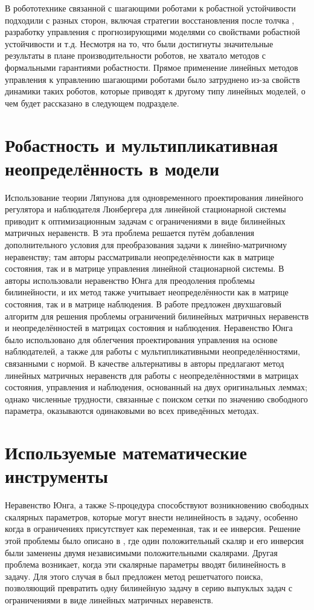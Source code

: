 В робототехнике связанной с шагающими роботами к робастной устойчивости подходили с разных сторон, включая стратегии восстановления после толчка \cite{Pratt2006}, разработку управления с прогнозирующими моделями со свойствами робастной устойчивости \cite{KIM2019} и т.д. Несмотря на то, что были достигнуты значительные результаты в плане производительности роботов, не хватало методов с формальными гарантиями робастности. Прямое применение линейных методов управления к управлению шагающими роботами было затруднено из-за свойств динамики таких роботов, которые приводят к другому типу линейных моделей, о чем будет рассказано в следующем подразделе.

\section{Робастность и мультипликативная неопределённость в модели}\label{sec:ch1/sec5}
Использование теории Ляпунова для одновременного проектирования линейного регулятора и наблюдателя Люнбергера для линейной стационарной системы приводит к оптимизационным задачам с ограничениями в виде билинейных матричных неравенств. В \cite{LIEN2004} эта проблема решается путём добавления дополнительного условия для преобразования задачи к линейно-матричному неравенству; там авторы рассматривали неопределённости как в матрице состояния, так и в матрице управления линейной стационарной системы. В \cite{KHELOUFI2013} авторы использовали неравенство Юнга для преодоления проблемы билинейности, и их метод также учитывает неопределённости как в матрице состояния, так и в матрице наблюдения. В работе \cite{ZEMOUCHE2015} предложен двухшаговый алгоритм для решения проблемы ограничений билинейных матричных неравенств и неопределённостей в матрицах состояния и наблюдения. Неравенство Юнга было использовано для облегчения проектирования управления на основе наблюдателей, а также для работы с мультипликативными неопределённостями, связанными с нормой. В качестве альтернативы в \cite{GRITLI2021} авторы предлагают метод линейных матричных неравенств для работы с неопределённостями в матрицах состояния, управления и наблюдения, основанный на двух оригинальных леммах; однако численные трудности, связанные с поиском сетки по значению свободного параметра, оказываются одинаковыми во всех приведённых методах.
 
\section{Используемые математические инструменты}\label{sec:ch1/sec6}
Неравенство Юнга, а также S-процедура \cite{Amato2011,LIEN2008} способствуют возникновению свободных скалярных параметров, которые могут внести нелинейность в задачу, особенно когда в ограничениях присутствует как переменная, так и ее инверсия. Решение этой проблемы было описано в \cite{KHELOUFI2016}, где один положительный скаляр и его инверсия были заменены двумя независимыми положительными скалярами. Другая проблема возникает, когда эти скалярные параметры вводят билинейность в задачу. Для этого случая в \cite{KHELOUFI2013} был предложен метод решетчатого поиска, позволяющий превратить одну билинейную задачу в серию выпуклых задач с ограничениями в виде линейных матричных неравенств.

